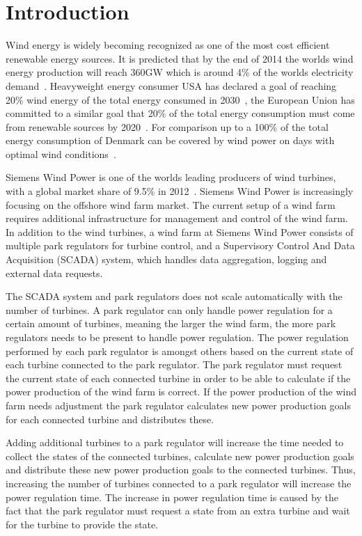 \chapter{Introduction}
\label{chap:intro}

Wind energy is widely becoming recognized as one of the most cost efficient renewable energy sources.
It is predicted that by the end of 2014 the worlds wind energy production will reach 360GW which is around 4\% of the worlds electricity demand~\cite{worldwidewindcapacity}.
Heavyweight energy consumer USA has declared a goal of reaching 20\% wind energy of the total energy consumed in 2030~\cite{20percentenergy}, the European Union has committed to a similar goal that 20\% of the total energy consumption must come from renewable sources by 2020~\cite{directive2009}. For comparison up to a 100\% of the total energy consumption of Denmark can be covered by wind power on days with optimal wind conditions~\cite{100percentwindenergy}.

Siemens Wind Power is one of the worlds leading producers of wind turbines, with a global market share of 9.5\% in 2012~\cite{worldmarketupdate2012}.
Siemens Wind Power is increasingly focusing on the offshore wind farm market.
The current setup of a wind farm requires additional infrastructure for management and control of the wind farm.
In addition to the wind turbines, a wind farm at Siemens Wind Power consists of multiple park regulators for turbine control, and a Supervisory Control And Data Acquisition (SCADA) system, which handles data aggregation, logging and external data requests.

The SCADA system and park regulators does not scale automatically with the number of turbines. A park regulator can only handle power regulation for a certain amount of turbines, meaning the larger the wind farm, the more park regulators needs to be present to handle power regulation.
The power regulation performed by each park regulator is amongst others based on the current state of each turbine connected to the park regulator.
The park regulator must request the current state of each connected turbine in order to be able to calculate if the power production of the wind farm is correct.
If the power production of the wind farm needs adjustment the park regulator calculates new power production goals for each connected turbine and distributes these.

Adding additional turbines to a park regulator will increase the time needed to collect the states of the connected turbines, calculate new power production goals and distribute these new power production goals to the connected turbines.
Thus, increasing the number of turbines connected to a park regulator will increase the power regulation time.
The increase in power regulation time is caused by the fact that the park regulator must request a state from an extra turbine and wait for the turbine to provide the state.

